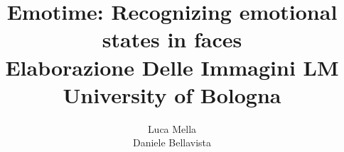 \documentclass[11pt]{article}
\newcommand{\xautha}{Luca Mella}
\newcommand{\xauthb}{Daniele Bellavista}
\newcommand{\xtitle}{Emotime: Recognizing emotional states in faces\\{\small Elaborazione Delle Immagini LM}\\{University of Bologna}}
\begin{document}
\title{\xtitle}
\author{\xautha\\\xauthb}

\maketitle
\newpage
\newpage












\nocite{*}

{}
\end{document}
